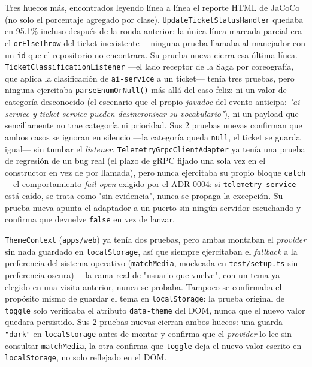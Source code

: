 Tres huecos más, encontrados leyendo línea a línea el reporte HTML de JaCoCo (no solo el
porcentaje agregado por clase). \texttt{UpdateTicketStatusHandler} quedaba en 95.1\% incluso
después de la ronda anterior: la única línea marcada parcial era el \texttt{orElseThrow} del
ticket inexistente —ninguna prueba llamaba al manejador con un \texttt{id} que el repositorio no
encontrara. Su prueba nueva cierra esa última línea.
\texttt{TicketClassificationListener} —el lado receptor de la Saga por coreografía, que aplica
la clasificación de \texttt{ai-service} a un ticket— tenía tres pruebas, pero ninguna ejercitaba
\texttt{parseEnumOrNull()} más allá del caso feliz: ni un valor de categoría desconocido (el
escenario que el propio \emph{javadoc} del evento anticipa: \emph{"ai-service y ticket-service
pueden desincronizar su vocabulario"}), ni un payload que sencillamente no trae categoría ni
prioridad. Sus 2 pruebas nuevas confirman que ambos casos se ignoran en silencio —la categoría
queda \texttt{null}, el ticket se guarda igual— sin tumbar el \emph{listener}.
\texttt{TelemetryGrpcClientAdapter} ya tenía una prueba de regresión de un bug real (el plazo de
gRPC fijado una sola vez en el constructor en vez de por llamada), pero nunca ejercitaba su
propio bloque \texttt{catch} —el comportamiento \emph{fail-open} exigido por el ADR-0004: si
\texttt{telemetry-service} está caído, se trata como "sin evidencia", nunca se propaga la
excepción. Su prueba nueva apunta el adaptador a un puerto sin ningún servidor escuchando y
confirma que devuelve \texttt{false} en vez de lanzar.

\texttt{ThemeContext} (\texttt{apps/web}) ya tenía dos pruebas, pero ambas montaban el
\emph{provider} sin nada guardado en \texttt{localStorage}, así que siempre ejercitaban el
\emph{fallback} a la preferencia del sistema operativo (\texttt{matchMedia}, mockeada en
\texttt{test/setup.ts} sin preferencia oscura) —la rama real de "usuario que vuelve", con un
tema ya elegido en una visita anterior, nunca se probaba. Tampoco se confirmaba el propósito
mismo de guardar el tema en \texttt{localStorage}: la prueba original de \texttt{toggle} solo
verificaba el atributo \texttt{data-theme} del DOM, nunca que el nuevo valor quedara persistido.
Sus 2 pruebas nuevas cierran ambos huecos: una guarda \texttt{"dark"} en \texttt{localStorage}
antes de montar y confirma que el \emph{provider} lo lee sin consultar \texttt{matchMedia}, la
otra confirma que \texttt{toggle} deja el nuevo valor escrito en \texttt{localStorage}, no solo
reflejado en el DOM.

